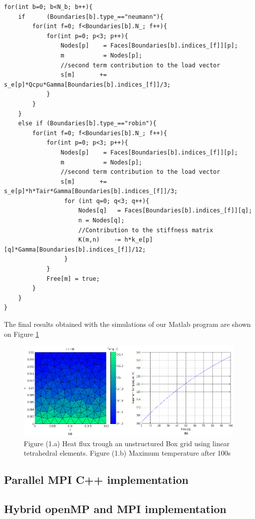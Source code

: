 \documentclass[12pt]{article}
\begin{document}
\begin{lstlisting}
for(int b=0; b<N_b; b++){
	if		(Boundaries[b].type_=="neumann"){
		for(int f=0; f<Boundaries[b].N_; f++){
			for(int p=0; p<3; p++){
				Nodes[p]	= Faces[Boundaries[b].indices_[f]][p];
				m			= Nodes[p];
				//second term contribution to the load vector
				s[m]	   += s_e[p]*Qcpu*Gamma[Boundaries[b].indices_[f]]/3; 
			}
		}
	}
	else if	(Boundaries[b].type_=="robin"){
		for(int f=0; f<Boundaries[b].N_; f++){
			for(int p=0; p<3; p++){
				Nodes[p]	= Faces[Boundaries[b].indices_[f]][p];
				m			= Nodes[p];
				//second term contribution to the load vector
				s[m]	   += s_e[p]*h*Tair*Gamma[Boundaries[b].indices_[f]]/3; 
				 for (int q=0; q<3; q++){
					 Nodes[q]	= Faces[Boundaries[b].indices_[f]][q];
					 n = Nodes[q];
					 //Contribution to the stiffness matrix
					 K(m,n)    -= h*k_e[p][q]*Gamma[Boundaries[b].indices_[f]]/12; 
				 }
			}
			Free[m] = true;
		}
	}
}
\end{lstlisting}


The final results obtained with the simulations of our Matlab program are shown on Figure \ref{fig:matlab1}

\begin{figure}[h!]
    \includegraphics[scale=0.6]{matlab1}
    \caption{Figure (1.a) Heat flux trough an unstructured Box grid using linear tetrahedral elements. Figure (1.b) Maximum temperature after 100s}
    \label{fig:matlab1}
\end{figure}

\subsection{Parallel MPI C++ implementation}

\subsection{Hybrid openMP and MPI implementation}
\end{document}
